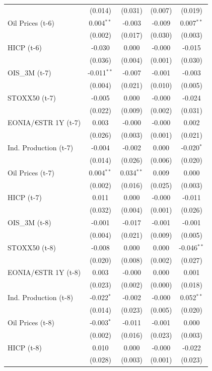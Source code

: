 \begin{longtable}[t]{lcccc}
 & (0.014) & (0.031) & (0.007) & (0.019)\\
Oil Prices (t-6) & 0.004$^{**}$ & -0.003 & -0.009 & 0.007$^{**}$\\
 & (0.002) & (0.017) & (0.030) & (0.003)\\
HICP (t-6) & -0.030 & 0.000 & -0.000 & -0.015\\
 & (0.036) & (0.004) & (0.001) & (0.030)\\
OIS\_3M (t-7) & -0.011$^{**}$ & -0.007 & -0.001 & -0.003\\
 & (0.004) & (0.021) & (0.010) & (0.005)\\
STOXX50 (t-7) & -0.005 & 0.000 & -0.000 & -0.024\\
 & (0.022) & (0.009) & (0.002) & (0.031)\\
EONIA/€STR 1Y (t-7) & 0.003 & -0.000 & -0.000 & 0.002\\
 & (0.026) & (0.003) & (0.001) & (0.021)\\
Ind. Production (t-7) & -0.004 & -0.002 & 0.000 & -0.020$^{*}$\\
 & (0.014) & (0.026) & (0.006) & (0.020)\\
Oil Prices (t-7) & 0.004$^{**}$ & 0.034$^{**}$ & 0.009 & 0.000\\
 & (0.002) & (0.016) & (0.025) & (0.003)\\
HICP (t-7) & 0.011 & 0.000 & -0.000 & -0.011\\
 & (0.032) & (0.004) & (0.001) & (0.026)\\
OIS\_3M (t-8) & -0.001 & -0.017 & -0.001 & -0.001\\
 & (0.004) & (0.021) & (0.009) & (0.005)\\
STOXX50 (t-8) & -0.008 & 0.000 & 0.000 & -0.046$^{**}$\\
 & (0.020) & (0.008) & (0.002) & (0.027)\\
EONIA/€STR 1Y (t-8) & 0.003 & -0.000 & 0.000 & 0.001\\
 & (0.023) & (0.002) & (0.000) & (0.018)\\
Ind. Production (t-8) & -0.022$^{*}$ & -0.002 & -0.000 & 0.052$^{**}$\\
 & (0.014) & (0.023) & (0.005) & (0.020)\\
Oil Prices (t-8) & -0.003$^{*}$ & -0.011 & -0.001 & 0.000\\
 & (0.002) & (0.016) & (0.023) & (0.003)\\
HICP (t-8) & 0.010 & 0.000 & -0.000 & -0.022\\
 & (0.028) & (0.003) & (0.001) & (0.023)\\

\end{longtable}
